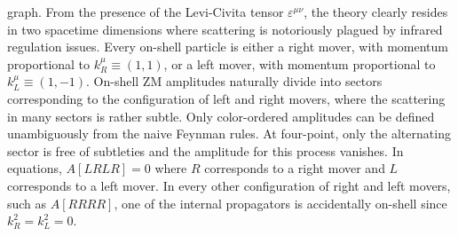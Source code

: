 \documentclass[11pt,letter]{article}
\begin{document}
graph.  From the presence of the Levi-Civita tensor
$\varepsilon^{\mu\nu}$, the theory clearly resides in two spacetime
dimensions where scattering is notoriously plagued by infrared
regulation issues.  Every on-shell particle is either a right mover,
with momentum proportional to $k_R^\mu \equiv (1,1)$, or a left mover,
with momentum proportional to $k_L^\mu \equiv (1,-1)$.  On-shell ZM
amplitudes naturally divide into sectors corresponding to the
configuration of left and right movers, where the scattering in many
sectors is rather subtle.  Only color-ordered amplitudes can be
defined unambiguously from the naive Feynman rules.  At four-point, only the
alternating sector is free of subtleties and the amplitude for this
process vanishes.  In equations, $A[LRLR]=0$ where $R$ corresponds to
a right mover and $L$ corresponds to a left mover.  In every other
configuration of right and left movers, such as $A[RRRR]$, one of the
internal propagators is accidentally on-shell since $k_R^2=k_L^2=0$.
\end{document}
